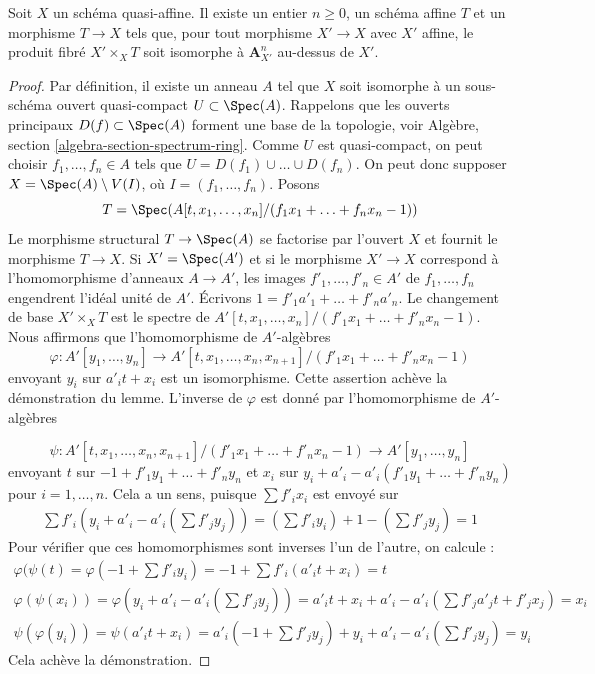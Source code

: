 \begin{lemma}
\label{lemma-quasi-affine-presentation}
Soit $X$ un schéma quasi-affine. Il existe un entier $n \geq 0$,
un schéma affine $T$ et un morphisme $T \to X$ tels que, pour tout
morphisme $X' \to X$ avec $X'$ affine, le produit fibré $X' \times_X T$
soit isomorphe à $\mathbf{A}^n_{X'}$ au-dessus de $X'$.
\end{lemma}

\begin{proof}
Par définition, il existe un anneau $A$ tel que $X$ soit isomorphe à un
sous-schéma ouvert quasi-compact $U \subset \Spec(A)$. Rappelons que les ouverts
principaux $D(f) \subset \Spec(A)$ forment une base de la topologie, voir
Algèbre, section \ref{algebra-section-spectrum-ring}. Comme $U$ est
quasi-compact, on peut choisir $f_1, \ldots, f_n \in A$ tels que
$U = D(f_1) \cup \ldots \cup D(f_n)$. On peut donc supposer
$X = \Spec(A) \setminus V(I)$, où $I = (f_1, \ldots, f_n)$. Posons
$$
T = \Spec(A[t, x_1, \ldots, x_n]/(f_1 x_1 + \ldots + f_n x_n - 1))
$$
Le morphisme structural $T \to \Spec(A)$ se factorise par l'ouvert $X$
et fournit le morphisme $T \to X$. Si $X' = \Spec(A')$ et si le morphisme
$X' \to X$ correspond à l'homomorphisme d'anneaux $A \to A'$, les images
$f'_1, \ldots, f'_n \in A'$ de $f_1, \ldots, f_n$
engendrent l'idéal unité de $A'$.
Écrivons $1 = f'_1 a'_1 + \ldots + f'_n a'_n$.
Le changement de base $X' \times_X T$ est le spectre de
$A'[t, x_1, \ldots, x_n]/(f'_1 x_1 + \ldots + f'_n x_n - 1)$.
Nous affirmons que l'homomorphisme de $A'$-algèbres
$$
\varphi :
A'[y_1, \ldots, y_n]
\longrightarrow
A'[t, x_1, \ldots, x_n, x_{n + 1}]/(f'_1 x_1 + \ldots + f'_n x_n - 1)
$$
envoyant $y_i$ sur $a'_i t + x_i$ est un isomorphisme. Cette assertion achève
la démonstration du lemme. L'inverse de $\varphi$ est donné par l'homomorphisme de $A'$-algèbres

$$
\psi :
A'[t, x_1, \ldots, x_n, x_{n + 1}]/(f'_1 x_1 + \ldots + f'_n x_n - 1)
\longrightarrow
A'[y_1, \ldots, y_n]
$$
envoyant $t$ sur $-1 + f'_1 y_1 + \ldots + f'_n y_n$ et $x_i$ sur
$y_i + a'_i - a'_i(f'_1 y_1 + \ldots + f'_n y_n)$ pour $i = 1, \ldots, n$.
Cela a un sens, puisque $\sum f'_ix_i$ est envoyé sur
$$
\begin{matrix}
\sum f'_i(y_i + a'_i - a'_i(\sum f'_j y_j)) =
(\sum f'_iy_i) + 1 - (\sum f'_j y_j) = 1
\end{matrix}
$$
Pour vérifier que ces homomorphismes sont inverses l'un de l'autre, on calcule :
$$
\begin{matrix}
\varphi(\psi(t) = \varphi(-1 +  \sum f'_i y_i) =
-1 + \sum f'_i (a'_i t + x_i) = t \\
\varphi(\psi(x_i)) = \varphi(y_i + a'_i - a'_i(\sum f'_j y_j)) =
a'_i t + x_i + a'_i - a'_i(\sum f'_ja'_jt + f'_jx_j) = x_i \\
\psi(\varphi(y_i)) = \psi(a'_i t + x_i) =
a'_i(-1 + \sum f'_j y_j) + y_i + a'_i - a'_i(\sum f'_j y_j) = y_i
\end{matrix}
$$
Cela achève la démonstration.
\end{proof}

